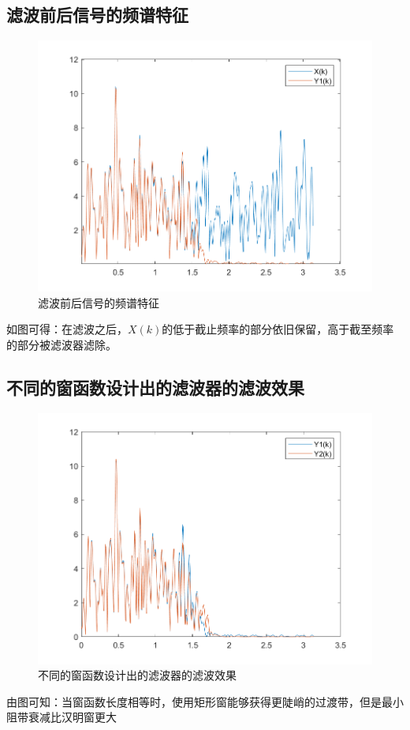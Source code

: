 \documentclass{../source/zjureport}
\begin{document}
        \subsection{滤波前后信号的频谱特征}
        \begin{figure}[H]
            \centering
            \includegraphics[scale = 0.7]{figure/X(k)与Y1(k)区别.png}
            \caption{滤波前后信号的频谱特征}
        \end{figure}
        如图可得：在滤波之后，$X(k)$的低于截止频率的部分依旧保留，高于截至频率的部分被滤波器滤除。

        \subsection{不同的窗函数设计出的滤波器的滤波效果}
        \begin{figure}[H]
            \centering
            \includegraphics[scale = 0.7]{figure/Y2(k)与Y1(k)区别.png}
            \caption{不同的窗函数设计出的滤波器的滤波效果}
        \end{figure}
        由图可知：当窗函数长度相等时，使用矩形窗能够获得更陡峭的过渡带，但是最小阻带衰减比汉明窗更大
\end{document}

